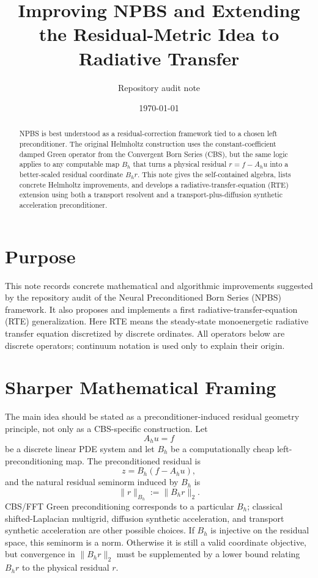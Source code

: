 \documentclass[11pt]{article}
\title{Improving NPBS and Extending the Residual-Metric Idea to Radiative Transfer}
\author{Repository audit note}
\date{\today}
\begin{document}
\maketitle

\begin{abstract}
NPBS is best understood as a residual-correction framework tied to a chosen
left preconditioner.  The original Helmholtz construction uses the
constant-coefficient damped Green operator from the Convergent Born Series
(CBS), but the same logic applies to any computable map \(B_h\) that turns a
physical residual \(r=f-A_hu\) into a better-scaled residual coordinate
\(B_hr\).  This note gives the self-contained algebra, lists concrete
Helmholtz improvements, and develops a radiative-transfer-equation (RTE)
extension using both a transport resolvent and a transport-plus-diffusion
synthetic acceleration preconditioner.
\end{abstract}

\section{Purpose}

This note records concrete mathematical and algorithmic improvements suggested by
the repository audit of the Neural Preconditioned Born Series (NPBS) framework.
It also proposes and implements a first radiative-transfer-equation (RTE)
generalization. Here RTE means the steady-state monoenergetic radiative transfer
equation discretized by discrete ordinates.  All operators below are discrete
operators; continuum notation is used only to explain their origin.

\section{Sharper Mathematical Framing}

The main idea should be stated as a preconditioner-induced residual geometry
principle, not only as a CBS-specific construction. Let
\[
  A_h u = f
\]
be a discrete linear PDE system and let \(B_h\) be a computationally cheap
left-preconditioning map. The preconditioned residual is
\[
  z = B_h(f-A_h u),
\]
and the natural residual seminorm induced by \(B_h\) is
\[
  \|r\|_{B_h} := \|B_h r\|_2 .
\]
CBS/FFT Green preconditioning corresponds to a particular \(B_h\); classical
shifted-Laplacian multigrid, diffusion synthetic acceleration, and transport
synthetic acceleration are other possible choices.
If \(B_h\) is injective on the residual space, this seminorm is a norm.
Otherwise it is still a valid coordinate objective, but convergence in
\(\|B_hr\|_2\) must be supplemented by a lower bound relating \(B_hr\) to the
physical residual \(r\).
\end{document}
